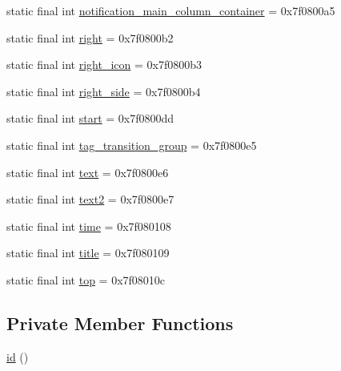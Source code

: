 \begin{DoxyCompactItemize}
\item 
static final int \mbox{\hyperlink{classandroid_1_1support_1_1v7_1_1recyclerview_1_1_r_1_1id_ab3bb3163b0e57fe866817147c9cf6daf}{notification\+\_\+main\+\_\+column\+\_\+container}} = 0x7f0800a5
\item 
static final int \mbox{\hyperlink{classandroid_1_1support_1_1v7_1_1recyclerview_1_1_r_1_1id_a32fd247d03245cc4df54cb6e92a1d48e}{right}} = 0x7f0800b2
\item 
static final int \mbox{\hyperlink{classandroid_1_1support_1_1v7_1_1recyclerview_1_1_r_1_1id_adbb32d209cbc4651b3649361fa9589d9}{right\+\_\+icon}} = 0x7f0800b3
\item 
static final int \mbox{\hyperlink{classandroid_1_1support_1_1v7_1_1recyclerview_1_1_r_1_1id_af5f1a3cd603a2a722e8c1bfdec244706}{right\+\_\+side}} = 0x7f0800b4
\item 
static final int \mbox{\hyperlink{classandroid_1_1support_1_1v7_1_1recyclerview_1_1_r_1_1id_abad49879b0a3197ed72fd997cc05bc10}{start}} = 0x7f0800dd
\item 
static final int \mbox{\hyperlink{classandroid_1_1support_1_1v7_1_1recyclerview_1_1_r_1_1id_a4e9c9dd88884bcc1f1f619072d31da22}{tag\+\_\+transition\+\_\+group}} = 0x7f0800e5
\item 
static final int \mbox{\hyperlink{classandroid_1_1support_1_1v7_1_1recyclerview_1_1_r_1_1id_a45089e18af035f2601a681173e7a52a2}{text}} = 0x7f0800e6
\item 
static final int \mbox{\hyperlink{classandroid_1_1support_1_1v7_1_1recyclerview_1_1_r_1_1id_a6e2b5d1ff0e263a6280932e2d572edb8}{text2}} = 0x7f0800e7
\item 
static final int \mbox{\hyperlink{classandroid_1_1support_1_1v7_1_1recyclerview_1_1_r_1_1id_a45100a406d89b4edab15304790e2cdf9}{time}} = 0x7f080108
\item 
static final int \mbox{\hyperlink{classandroid_1_1support_1_1v7_1_1recyclerview_1_1_r_1_1id_ad991ba2a84a04eae17e80bf0149e4e36}{title}} = 0x7f080109
\item 
static final int \mbox{\hyperlink{classandroid_1_1support_1_1v7_1_1recyclerview_1_1_r_1_1id_a892287b46da23e14501108cc558b9cd8}{top}} = 0x7f08010c
\end{DoxyCompactItemize}
\subsection*{Private Member Functions}
\begin{DoxyCompactItemize}
\item 
\mbox{\hyperlink{classandroid_1_1support_1_1v7_1_1recyclerview_1_1_r_1_1id_ada938b9468196583ec81ce4334b5add3}{id}} ()
\end{DoxyCompactItemize}


